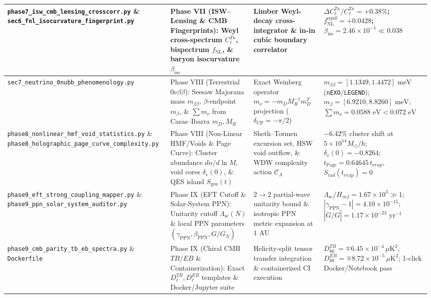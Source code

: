 \documentclass[aps,prd,onecolumn,superscriptaddress,nofootinbib,longbibliography,10pt]{revtex4-2}
\begin{document}
{{\begin{center}
\begin{tabular}{|llll|}
  \texttt{phase7_isw_cmb_lensing_crosscorr.py} \& \texttt{sec6_fnl_isocurvature_fingerprint.py} & Phase VII (ISW–Lensing \& CMB Fingerprints): Weyl cross-spectrum \(C_\ell^{T\kappa}\), bispectrum \(f_{\mathrm{NL}}\), \& baryon isocurvature \(\beta_{\mathrm{iso}}\) & Limber Weyl-decay cross-integrator \& in-in cubic boundary correlator & \(\Delta C_\ell^{T\kappa}/C_\ell^{T\kappa} = +0.38\%\); \(f_{\mathrm{NL}}^{\mathrm{equil}} = +0.0428\); \(\beta_{\mathrm{iso}} = 2.46 \times 10^{-5} \ll 0.038\)
 \\ \hline


  \texttt{sec7_neutrino_0nubb_phenomenology.py} & Phase VIII (Terrestrial \(0\nu\beta\beta\)): Seesaw Majorana mass \(m_{\beta\beta}\), \(\beta\)-endpoint \(m_\beta\), \& \(\sum m_\nu\) from Casas–Ibarra \(m_D, M_R\) & Exact Weinberg operator \(m_\nu = -m_D M_R^{-1} m_D^T\) projection (\(\delta_{\mathrm{CP}} = -\pi/2\)) & \(m_{\beta\beta} = [1.1349, 1.4472]\text{ meV}\) (\texttt{nEXO}/\texttt{LEGEND}); \(m_\beta = [6.9210, 8.8260]\text{ meV}\); \(\sum m_\nu = 0.0588\text{ eV} < 0.072\text{ eV}\)
 \\ \hline


  \texttt{phase8_nonlinear_hmf_void_statistics.py} \& \texttt{phase8_holographic_page_curve_complexity.py} & Phase VIII (Non-Linear HMF/Voids \& Page Curve): Cluster abundance \(dn/d\ln M\), void cores \(\delta_v(0)\), \& QES island \(S_{\mathrm{gen}}(t)\) & Sheth–Tormen excursion set, HSW void outflow, \& WDW complexity action \(\mathcal{C}_A\) & \(-6.42\%\) cluster shift at \(5\times 10^{14}M_\odot/h\); \(\delta_v(0) = -0.8264\); \(t_{\mathrm{Page}} = 0.64645\,t_{\mathrm{evap}}\), \(S_{\mathrm{rad}}(t_{\mathrm{evap}})=0\)
 \\ \hline


  \texttt{phase9_eft_strong_coupling_mapper.py} \& \texttt{phase9_ppn_solar_system_auditor.py} & Phase IX (EFT Cutoff \& Solar-System PPN): Unitarity cutoff \(\Lambda_{\mathrm{sc}}(N)\) \& local PPN parameters \((\gamma_{\mathrm{PPN}}, \beta_{\mathrm{PPN}}, \dot{G}/G_N)\) & \(2 \to 2\) partial-wave unitarity bound \& isotropic PPN metric expansion at \(1\text{ AU}\) & \(\Lambda_{\mathrm{sc}}/H_{inf} = 1.67 \times 10^3 \gg 1\); \(|\gamma_{\mathrm{PPN}}-1| = 4.10 \times 10^{-15}\); \(|\dot{G}/G| = 1.17 \times 10^{-23}\text{ yr}^{-1}\)
 \\ \hline


  \texttt{phase9_cmb_parity_tb_eb_spectra.py} \& \texttt{Dockerfile} & Phase IX (Chiral CMB \(TB/EB\) \& Containerization): Exact \(D_\ell^{TB}, D_\ell^{EB}\) templates \& Docker/Jupyter suite & Helicity-split tensor transfer integration \& containerized CI execution & \(D_{80}^{TB} = \mp 6.45 \times 10^{-4}\,\mu\mathrm{K}^2\), \(D_{80}^{EB} = \mp 8.72 \times 10^{-5}\,\mu\mathrm{K}^2\); 1-click Docker/Notebook pass
 \\ \hline


\end{tabular}
\end{center}}}
\end{document}
